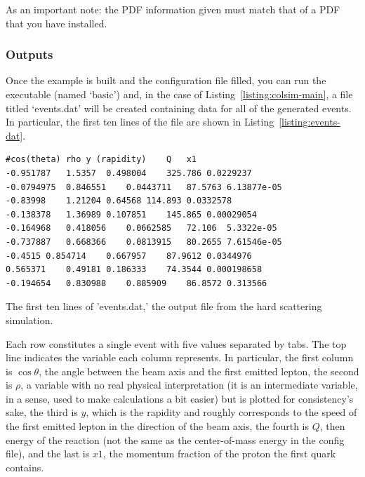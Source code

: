 As an important note: the PDF information given must match that of a PDF that you have installed. 


\subsubsection{Outputs}\label{sec:outputs}

Once the example is built and the configuration file filled, you can run the executable (named `basic') and, in the case of Listing~\ref{listing:colsim-main}, a file titled `events.dat' will be created containing data for all of the generated events. In particular, the first ten lines of the file are shown in Listing~\ref{listing:events-dat}.

\begin{listing}[!ht]
\begin{verbatim}
#cos(theta)	rho	y (rapidity)	Q	x1	
-0.951787	1.5357	0.498004	325.786	0.0229237	
-0.0794975	0.846551	0.0443711	87.5763	6.13877e-05	
-0.83998	1.21204	0.64568	114.893	0.0332578	
-0.138378	1.36989	0.107851	145.865	0.00029054	
-0.164968	0.418056	0.0662585	72.106	5.3322e-05	
-0.737887	0.668366	0.0813915	80.2655	7.61546e-05	
-0.4515	0.854714	0.667957	87.9612	0.0344976	
0.565371	0.49181	0.186333	74.3544	0.000198658	
-0.194654	0.830988	0.885909	86.8572	0.313566	
\end{verbatim}
\caption{The first ten lines of 'events.dat,' the output file from the hard scattering simulation.}
\label{listing:events-dat}
\end{listing}

Each row constitutes a single event with five values separated by tabs. The top line indicates the variable each column represents. In particular, the first column is $\cos\theta$, the angle between the beam axis and the first emitted lepton, the second is $\rho$, a variable with no real physical interpretation (it is an intermediate variable, in a sense, used to make calculations a bit easier) but is plotted for consistency's sake, the third is $y$, which is the rapidity and roughly corresponds to the speed of the first emitted lepton in the direction of the beam axis, the fourth is $Q$, then energy of the reaction (not the same as the center-of-mass energy in the config file), and the last is $x1$, the momentum fraction of the proton the first quark contains.

